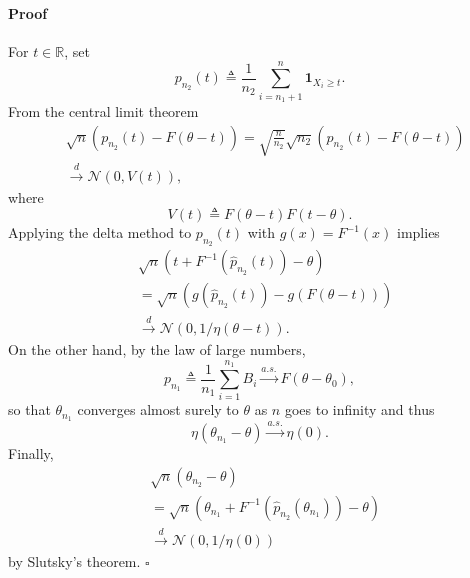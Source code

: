 \documentclass[letterpaper, 11pt]{IEEEtran}      %
\newenvironment{proof}{\paragraph*{Proof}}{\hfill$\square$ \newline}
\newcommand{\Ncal}{\mathcal{N}}
\begin{document}
%
%
\begin{proof}
For $t\in \mathbb R$, set
\[
p_{n_2}(t) \triangleq \frac{1}{n_2} \sum_{i=n_1+1}^{n} \mathbf 1_{X_i \geq t}. 
\]
From the central limit theorem
\begin{align*}
& \sqrt{n} \left( p_{n_2}(t) - F( \theta - t) \right)  = \sqrt{\frac{n}{n_2}} \sqrt{n_2} \left(  p_{n_2}(t) - F(\theta - t) \right) \\
& \overset{d}{\rightarrow} \Ncal\left( 0, V(t) \right),
\end{align*}
where
\[
V(t) \triangleq F(\theta - t) F \left( t - \theta\right). 
\]
Applying the delta method to $p_{n_2}(t)$ with $g(x) = F^{-1}(x)$ implies
\begin{align*}
& \sqrt{n} \left( t + F^{-1}(\hat{p}_{n_2}(t)) - \theta \right) \\
&= \sqrt{n} \left( g(\hat{p}_{n_2}(t)) - g \left(F(\theta-t) \right)  \right) \\
& \overset{d}{\to} \Ncal\left(0, 
1/\eta(\theta-t) \right).
\end{align*}
On the other hand, by the law of large numbers,
\[
p_{n_1} \triangleq \frac{1}{n_1} \sum_{i=1}^{n_1} B_i \overset{a.s.}{\rightarrow} F(\theta - \theta_0),
\]
so that ${\theta}_{n_1}$ converges almost surely to $\theta$ as $n$ goes to infinity and thus 
\[
\eta( {\theta}_{n_1}-\theta) \overset{a.s.}{\rightarrow} \eta(0). 
\]
Finally,
\begin{align*}
& \sqrt{n}\left({\theta}_{n_2} - \theta\right) \\
& = \sqrt{n} \left( {\theta}_{n_1} + F^{-1}(\hat{p}_{n_2}({\theta}_{n_1})) - \theta \right)  \\
& \overset{d}{\to} \Ncal\left( 0, 
1/\eta(0) \right) 
\end{align*}
by Slutsky's theorem.
\end{proof}
%
\end{document}
